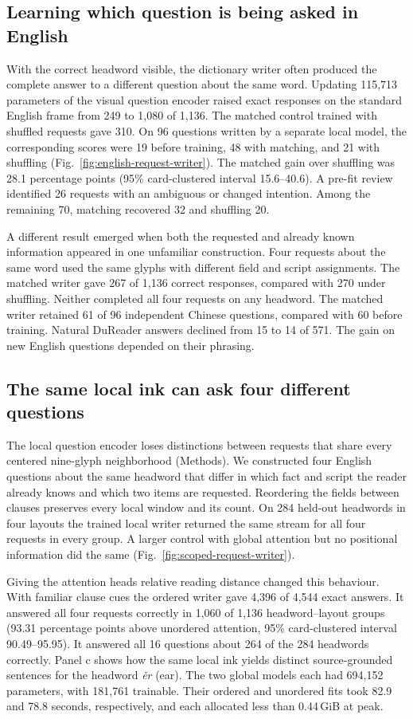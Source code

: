 \documentclass[12pt,a4paper]{article}
\providecommand{\DIFadd}[1]{{\protect\color{blue} \sf #1}} %
\begin{document}
\subsection*{\DIFadd{Learning which question is being asked in English}}
\DIFadd{With the correct headword visible, the dictionary writer often produced the complete answer to a different question about the same word. Updating 115,713 parameters of the visual question encoder raised exact responses on the standard English frame from 249 to 1,080 of 1,136. The matched control trained with shuffled requests gave 310. On 96 questions written by a separate local model, the corresponding scores were 19 before training, 48 with matching, and 21 with shuffling (Fig.~\ref{fig:english-request-writer}). The matched gain over shuffling was 28.1 percentage points (95\% card-clustered interval 15.6--40.6). A pre-fit review identified 26 requests with an ambiguous or changed intention. Among the remaining 70, matching recovered 32 and shuffling 20.
}

\DIFadd{A different result emerged when both the requested and already known information appeared in one unfamiliar construction. Four requests about the same word used the same glyphs with different field and script assignments. The matched writer gave 267 of 1,136 correct responses, compared with 270 under shuffling. Neither completed all four requests on any headword. The matched writer retained 61 of 96 independent Chinese questions, compared with 60 before training. Natural DuReader answers declined from 15 to 14 of 571. The gain on new English questions depended on their phrasing.
}

\subsection*{\DIFadd{The same local ink can ask four different questions}}
\DIFadd{The local question encoder loses distinctions between requests that share every centered nine-glyph neighborhood (Methods). We constructed four English questions about the same headword that differ in which fact and script the reader already knows and which two items are requested. Reordering the fields between clauses preserves every local window and its count. On 284 held-out headwords in four layouts the trained local writer returned the same stream for all four requests in every group. A larger control with global attention but no positional information did the same (Fig.~\ref{fig:scoped-request-writer}).
}

\DIFadd{Giving the attention heads relative reading distance changed this behaviour. With familiar clause cues the ordered writer gave 4,396 of 4,544 exact answers. It answered all four requests correctly in 1,060 of 1,136 headword--layout groups (93.31 percentage points above unordered attention, 95\% card-clustered interval 90.49--95.95). It answered all 16 questions about 264 of the 284 headwords correctly. Panel c shows how the same local ink yields distinct source-grounded sentences for the headword \textit{\v{e}r} (ear). The two global models each had 694,152 parameters, with 181,761 trainable. Their ordered and unordered fits took 82.9 and 78.8 seconds, respectively, and each allocated less than 0.44\,GiB at peak.
}
\end{document}
